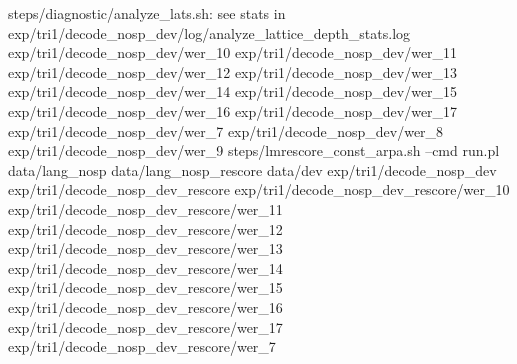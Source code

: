 steps/diagnostic/analyze_lats.sh: see stats in exp/tri1/decode_nosp_dev/log/analyze_lattice_depth_stats.log
exp/tri1/decode_nosp_dev/wer_10
exp/tri1/decode_nosp_dev/wer_11
exp/tri1/decode_nosp_dev/wer_12
exp/tri1/decode_nosp_dev/wer_13
exp/tri1/decode_nosp_dev/wer_14
exp/tri1/decode_nosp_dev/wer_15
exp/tri1/decode_nosp_dev/wer_16
exp/tri1/decode_nosp_dev/wer_17
exp/tri1/decode_nosp_dev/wer_7
exp/tri1/decode_nosp_dev/wer_8
exp/tri1/decode_nosp_dev/wer_9
steps/lmrescore_const_arpa.sh --cmd run.pl data/lang_nosp data/lang_nosp_rescore data/dev exp/tri1/decode_nosp_dev exp/tri1/decode_nosp_dev_rescore
exp/tri1/decode_nosp_dev_rescore/wer_10
exp/tri1/decode_nosp_dev_rescore/wer_11
exp/tri1/decode_nosp_dev_rescore/wer_12
exp/tri1/decode_nosp_dev_rescore/wer_13
exp/tri1/decode_nosp_dev_rescore/wer_14
exp/tri1/decode_nosp_dev_rescore/wer_15
exp/tri1/decode_nosp_dev_rescore/wer_16
exp/tri1/decode_nosp_dev_rescore/wer_17
exp/tri1/decode_nosp_dev_rescore/wer_7
